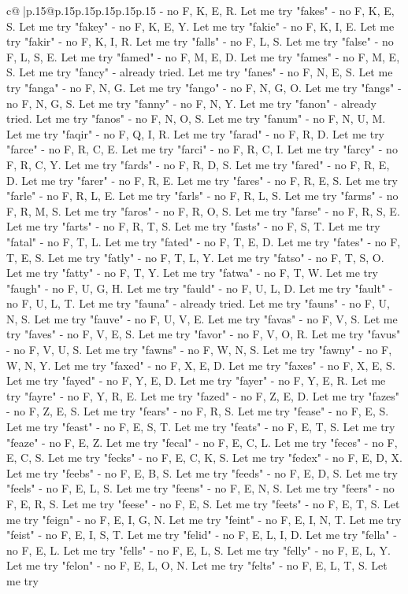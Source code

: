 \documentclass{article}
\begin{document}
{\begin{supertabular}{c@{$\;$}|p{.15\linewidth}@{}p{.15\linewidth}p{.15\linewidth}p{.15\linewidth}p{.15\linewidth}p{.15\linewidth}}
{{{{-} no F, K, E, R. Let me try "fakes" {-} no F, K, E, S. Let me try "fakey" {-} no F, K, E, Y. Let me try "fakie" {-} no F, K, I, E. Let me try "fakir" {-} no F, K, I, R. Let me try "falls" {-} no F, L, S. Let me try "false" {-} no F, L, S, E. Let me try "famed" {-} no F, M, E, D. Let me try "fames" {-} no F, M, E, S. Let me try "fancy" {-} already tried. Let me try "fanes" {-} no F, N, E, S. Let me try "fanga" {-} no F, N, G. Let me try "fango" {-} no F, N, G, O. Let me try "fangs" {-} no F, N, G, S. Let me try "fanny" {-} no F, N, Y. Let me try "fanon" {-} already tried. Let me try "fanos" {-} no F, N, O, S. Let me try "fanum" {-} no F, N, U, M. Let me try "faqir" {-} no F, Q, I, R. Let me try "farad" {-} no F, R, D. Let me try "farce" {-} no F, R, C, E. Let me try "farci" {-} no F, R, C, I. Let me try "farcy" {-} no F, R, C, Y. Let me try "fards" {-} no F, R, D, S. Let me try "fared" {-} no F, R, E, D. Let me try "farer" {-} no F, R, E. Let me try "fares" {-} no F, R, E, S. Let me try "farle" {-} no F, R, L, E. Let me try "farls" {-} no F, R, L, S. Let me try "farms" {-} no F, R, M, S. Let me try "faros" {-} no F, R, O, S. Let me try "farse" {-} no F, R, S, E. Let me try "farts" {-} no F, R, T, S. Let me try "fasts" {-} no F, S, T. Let me try "fatal" {-} no F, T, L. Let me try "fated" {-} no F, T, E, D. Let me try "fates" {-} no F, T, E, S. Let me try "fatly" {-} no F, T, L, Y. Let me try "fatso" {-} no F, T, S, O. Let me try "fatty" {-} no F, T, Y. Let me try "fatwa" {-} no F, T, W. Let me try "faugh" {-} no F, U, G, H. Let me try "fauld" {-} no F, U, L, D. Let me try "fault" {-} no F, U, L, T. Let me try "fauna" {-} already tried. Let me try "fauns" {-} no F, U, N, S. Let me try "fauve" {-} no F, U, V, E. Let me try "favas" {-} no F, V, S. Let me try "faves" {-} no F, V, E, S. Let me try "favor" {-} no F, V, O, R. Let me try "favus" {-} no F, V, U, S. Let me try "fawns" {-} no F, W, N, S. Let me try "fawny" {-} no F, W, N, Y. Let me try "faxed" {-} no F, X, E, D. Let me try "faxes" {-} no F, X, E, S. Let me try "fayed" {-} no F, Y, E, D. Let me try "fayer" {-} no F, Y, E, R. Let me try "fayre" {-} no F, Y, R, E. Let me try "fazed" {-} no F, Z, E, D. Let me try "fazes" {-} no F, Z, E, S. Let me try "fears" {-} no F, R, S. Let me try "fease" {-} no F, E, S. Let me try "feast" {-} no F, E, S, T. Let me try "feats" {-} no F, E, T, S. Let me try "feaze" {-} no F, E, Z. Let me try "fecal" {-} no F, E, C, L. Let me try "feces" {-} no F, E, C, S. Let me try "fecks" {-} no F, E, C, K, S. Let me try "fedex" {-} no F, E, D, X. Let me try "feebs" {-} no F, E, B, S. Let me try "feeds" {-} no F, E, D, S. Let me try "feels" {-} no F, E, L, S. Let me try "feens" {-} no F, E, N, S. Let me try "feers" {-} no F, E, R, S. Let me try "feese" {-} no F, E, S. Let me try "feets" {-} no F, E, T, S. Let me try "feign" {-} no F, E, I, G, N. Let me try "feint" {-} no F, E, I, N, T. Let me try "feist" {-} no F, E, I, S, T. Let me try "felid" {-} no F, E, L, I, D. Let me try "fella" {-} no F, E, L. Let me try "fells" {-} no F, E, L, S. Let me try "felly" {-} no F, E, L, Y. Let me try "felon" {-} no F, E, L, O, N. Let me try "felts" {-} no F, E, L, T, S. Let me try }}}
\end{supertabular}}
\end{document}
